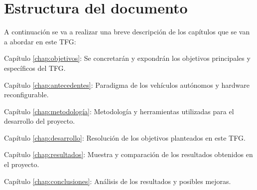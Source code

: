 \section{Estructura del documento}

A continuación se va a realizar una breve descripción de los capítulos que se van a abordar en este \ac{TFG}:

\begin{definitionlist}
\item[Capítulo \ref{chap:objetivos}: \nameref{chap:objetivos}] Se concretarán y expondrán los objetivos principales y específicos del \ac{TFG}.
\item[Capítulo \ref{chap:antecedentes}: \nameref{chap:antecedentes}] Paradigma de los vehículos autónomos y hardware reconfigurable.
\item[Capítulo \ref{chap:metodología}: \nameref{chap:metodología}] Metodología y herramientas utilizadas para el desarrollo del proyecto.
\item[Capítulo \ref{chap:desarrollo}: \nameref{chap:desarrollo}] Resolución de los objetivos planteados en este \ac{TFG}.
\item[Capítulo \ref{chap:resultados}: \nameref{chap:resultados}] Muestra y comparación de los resultados obtenidos en el proyecto.
\item[Capítulo \ref{chap:conclusiones}: \nameref{chap:conclusiones}] Análisis de los resultados y posibles mejoras.
\end{definitionlist}


